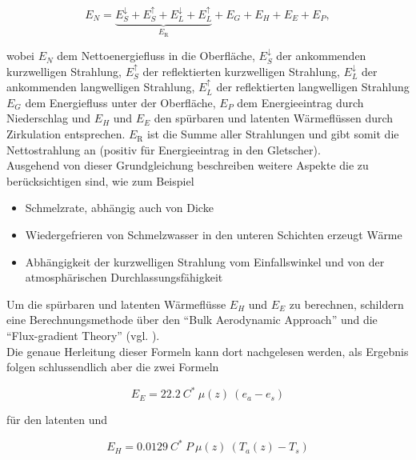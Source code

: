 \documentclass[11pt,a4paper]{article}
\begin{document}
\begin{equation}
E_{N}=\underbrace{E_{S}^{\downarrow}+E_{S}^{\uparrow}+E_{L}^{\downarrow}+E_{L}^{\uparrow}}_{E_{\mathrm{R}}}+E_{G}+E_{H}+E_{E}+E_{P},
\end{equation}

wobei $E_{N}$ dem Nettoenergiefluss in die Oberfläche, $E_{S}^{\downarrow}$ der ankommenden kurzwelligen Strahlung, $E_{S}^{\uparrow}$ der reflektierten kurzwelligen Strahlung, $E_{L}^{\downarrow}$ der ankommenden langwelligen Strahlung, $E_{L}^{\uparrow}$ der reflektierten langwelligen Strahlung $E_{G}$ dem Energiefluss unter der Oberfläche, $E_{P}$ dem Energieeintrag durch Niederschlag und $E_{H}$ und $E_{E}$ den spürbaren und latenten Wärmeflüssen durch Zirkulation entsprechen. $E_{\mathrm{R}}$ ist die Summe aller Strahlungen und gibt somit die Nettostrahlung an (positiv für Energieeintrag in den Gletscher).\\

Ausgehend von dieser Grundgleichung beschreiben \citeauthor{ThePhysicsOfGlaciers} weitere Aspekte die zu berücksichtigen sind, wie zum Beispiel 

\begin{itemize}
\item{Schmelzrate, abhängig auch von Dicke }
\item{Wiedergefrieren von Schmelzwasser in den unteren Schichten erzeugt Wärme}
\item{Abhängigkeit der kurzwelligen Strahlung vom Einfallswinkel und von der atmosphärischen Durchlassungsfähigkeit}
\end{itemize}

Um die spürbaren und latenten Wärmeflüsse $E_{H}$ und $E_{E}$ zu berechnen, schildern \citeauthor{ThePhysicsOfGlaciers} eine Berechnungsmethode über den ``Bulk Aerodynamic Approach'' und die ``Flux-gradient Theory'' (vgl. \cite[153-157]{ThePhysicsOfGlaciers}).\\
Die genaue Herleitung dieser Formeln kann dort nachgelesen werden, als Ergebnis folgen schlussendlich aber die zwei Formeln

\begin{equation}\label{eq:Berechnung latenter Energiefluss}
E_{E}= 22.2~C^*~\mu(z)~(e_a-e_s)
\end{equation}

für den latenten und

\begin{equation}\label{eq:Berechnung sensibler Energiefluss}
E_{H}= 0.0129~C^*~P~\mu(z)~(T_a(z)-T_s)
\end{equation}
\end{document}
